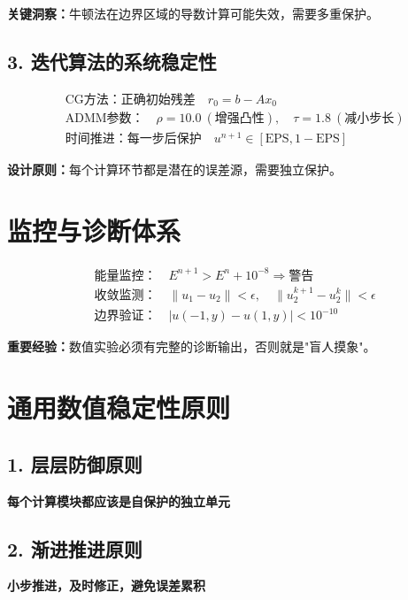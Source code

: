 \documentclass[11pt,a4 paper,one side]{article}
\begin{document}
\textbf{关键洞察：}牛顿法在边界区域的导数计算可能失效，需要多重保护。

\subsection*{3. 迭代算法的系统稳定性}

\begin{align*}
&\text{CG方法：正确初始残差} \quad r_0 = b - Ax_0\\
&\text{ADMM参数：} \quad \rho = 10.0 \ (\text{增强凸性}), \quad \tau = 1.8 \ (\text{减小步长})\\
&\text{时间推进：每一步后保护} \quad u^{n+1} \in [\text{EPS}, 1-\text{EPS}]
\end{align*}

\textbf{设计原则：}每个计算环节都是潜在的误差源，需要独立保护。

\section*{监控与诊断体系}

\begin{align*}
&\text{能量监控：} \quad E^{n+1} > E^n + 10^{-8} \Rightarrow \text{警告}\\
&\text{收敛监测：} \quad \|u_1 - u_2\| < \epsilon, \quad \|u_2^{k+1} - u_2^k\| < \epsilon\\
&\text{边界验证：} \quad |u(-1,y) - u(1,y)| < 10^{-10}
\end{align*}

\textbf{重要经验：}数值实验必须有完整的诊断输出，否则就是"盲人摸象"。

\section*{通用数值稳定性原则}

\subsection*{1. 层层防御原则}
\begin{center}
\textbf{每个计算模块都应该是自保护的独立单元}
\end{center}

\subsection*{2. 渐进推进原则}  
\begin{center}
\textbf{小步推进，及时修正，避免误差累积}
\end{center}
\end{document}
